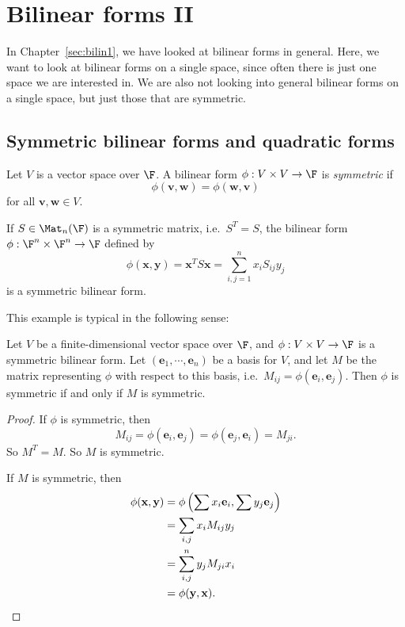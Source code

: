 \documentclass[a4paper]{article}
\begin{document}
\section{Bilinear forms II}
\label{sec:bilin2}
In Chapter~\ref{sec:bilin1}, we have looked at bilinear forms in general. Here, we want to look at bilinear forms on a single space, since often there is just one space we are interested in. We are also not looking into general bilinear forms on a single space, but just those that are symmetric.

\subsection{Symmetric bilinear forms and quadratic forms}
\begin{defi}
  Let $V$ is a vector space over $\F$. A bilinear form $\phi: V \times V \to \F$ is \emph{symmetric} if
  \[
    \phi(\mathbf{v}, \mathbf{w}) = \phi(\mathbf{w}, \mathbf{v})
  \]
  for all $\mathbf{v}, \mathbf{w} \in V$.
\end{defi}

\begin{eg}
  If $S \in \Mat_n(\F)$ is a symmetric matrix, i.e.\ $S^T = S$, the bilinear form $\phi: \F^n \times \F^n \to \F$ defined by
  \[
    \phi(\mathbf{x}, \mathbf{y}) = \mathbf{x}^T S\mathbf{x} = \sum_{i, j = 1}^n x_i S_{ij} y_j
  \]
  is a symmetric bilinear form.
\end{eg}
This example is typical in the following sense:

\begin{lemma}
  Let $V$ be a finite-dimensional vector space over $\F$, and $\phi: V\times V \to \F$ is a symmetric bilinear form. Let $(\mathbf{e}_1, \cdots, \mathbf{e}_n)$ be a basis for $V$, and let $M$ be the matrix representing $\phi$ with respect to this basis, i.e.\ $M_{ij} = \phi(\mathbf{e}_i, \mathbf{e}_j)$. Then $\phi$ is symmetric if and only if $M$ is symmetric.
\end{lemma}

\begin{proof}
  If $\phi$ is symmetric, then
  \[
    M_{ij} = \phi(\mathbf{e}_i, \mathbf{e}_j) = \phi(\mathbf{e}_j, \mathbf{e}_i) = M_{ji}.
  \]
  So $M^T = M$. So $M$ is symmetric.

  If $M$ is symmetric, then
  \begin{align*}
    \phi(\mathbf{x}, \mathbf{y}) &= \phi\left(\sum x_i \mathbf{e}_i, \sum y_j \mathbf{e}_j\right)\\
    &= \sum_{i, j} x_i M_{ij} y_j\\
    &= \sum_{i, j}^n y_j M_{ji} x_i\\
    &= \phi(\mathbf{y}, \mathbf{x}).\qedhere
  \end{align*}
\end{proof}
\end{document}
